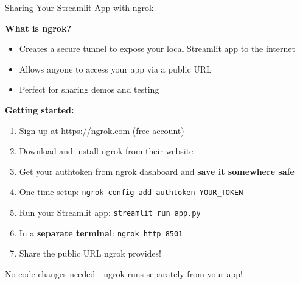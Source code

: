 \documentclass[aspectratio=169]{beamer}
\begin{document}
\begin{frame}{Sharing Your Streamlit App with ngrok}

\textbf{What is ngrok?}
\begin{itemize}
    \item Creates a secure tunnel to expose your local Streamlit app to the internet
    \item Allows anyone to access your app via a public URL
    \item Perfect for sharing demos and testing
\end{itemize}

\vspace{1em}

\textbf{Getting started:}
\begin{enumerate}
    \item Sign up at \url{https://ngrok.com} (free account)
    \item Download and install ngrok from their website
    \item Get your authtoken from ngrok dashboard and \textbf{save it somewhere safe}
    \item One-time setup: \texttt{ngrok config add-authtoken YOUR\_TOKEN}
    \item Run your Streamlit app: \texttt{streamlit run app.py}
    \item In a \textbf{separate terminal}: \texttt{ngrok http 8501}
    \item Share the public URL ngrok provides!
\end{enumerate}

\vspace{0.5em}

\small
No code changes needed - ngrok runs separately from your app!

\end{frame}
\end{document}
